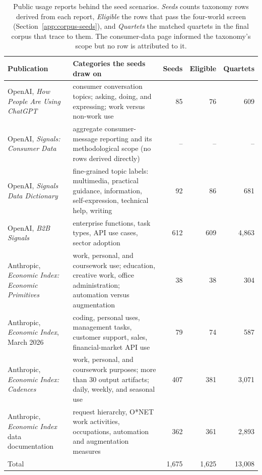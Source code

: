 \documentclass{article} %
\begin{document}
\begin{table}[htbp]
\centering\footnotesize
\begin{tabular}{@{}p{3.6cm}p{5.1cm}rrr@{}}
\toprule
Publication & Categories the seeds draw on & Seeds & Eligible & Quartets \\
\midrule
OpenAI, \emph{How People Are Using ChatGPT} \citep{openai2025howpeople,chatterji2025chatgpt} & consumer conversation topics; asking, doing, and expressing; work versus non-work use & 85 & 76 & 609 \\
OpenAI, \emph{Signals: Consumer Data} \citep{openai2026signals} & aggregate consumer-message reporting and its methodological scope (no rows derived directly) & -- & -- & -- \\
OpenAI, \emph{Signals Data Dictionary} \citep{openai2026signalsdict} & fine-grained topic labels: multimedia, practical guidance, information, self-expression, technical help, writing & 92 & 86 & 681 \\
OpenAI, \emph{B2B Signals} \citep{openai2026b2b} & enterprise functions, task types, API use cases, sector adoption & 612 & 609 & 4,863 \\
Anthropic, \emph{Economic Index: Economic Primitives} \citep{anthropic2026aeijan} & work, personal, and coursework use; education, creative work, office administration; automation versus augmentation & 38 & 38 & 304 \\
Anthropic, \emph{Economic Index}, March 2026 \citep{anthropic2026aeimar} & coding, personal uses, management tasks, customer support, sales, financial-market API use & 79 & 74 & 587 \\
Anthropic, \emph{Economic Index: Cadences} \citep{anthropic2026aeicadences} & work, personal, and coursework purposes; more than 30 output artifacts; daily, weekly, and seasonal use & 407 & 381 & 3,071 \\
Anthropic, \emph{Economic Index} data documentation \citep{anthropic2026aeidata} & request hierarchy, O*NET work activities, occupations, automation and augmentation measures & 362 & 361 & 2,893 \\
\midrule
Total & & 1,675 & 1,625 & 13,008 \\
\bottomrule
\end{tabular}
\caption{Public usage reports behind the seed scenarios. \emph{Seeds} counts taxonomy rows derived from each report, \emph{Eligible} the rows that pass the four-world screen (Section~\ref{app:corpus-seeds}), and \emph{Quartets} the matched quartets in the final corpus that trace to them. The consumer-data page informed the taxonomy's scope but no row is attributed to it.}
\label{tab:seed-sources}
\end{table}
\end{document}
